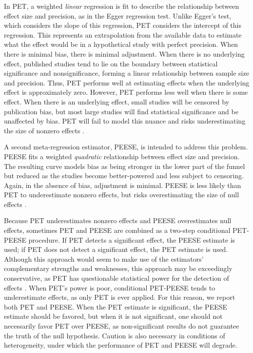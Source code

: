 \documentclass[jou]{apa6}
\begin{document}
In PET, a weighted {\em linear} regression is fit to describe the relationship between effect size and precision, as in the Egger regression test. Unlike Egger's test, which considers the slope of this regression, PET considers the intercept of this regression. This represents an extrapolation from the available data to estimate what the effect would be in a hypothetical study with perfect precision. When there is minimal bias, there is minimal adjustment. When there is no underlying effect, published studies tend to lie on the boundary between statistical significance and nonsignificance, forming a linear relationship between sample size and precision. Thus, PET performs well at estimating effects when the underlying effect is approximately zero. However, PET performs less well when there is some effect. When there is an underlying effect, small studies will be censored by publication bias, but most large studies will find statistical significance and be unaffected by bias. PET will fail to model this nuance and risks underestimating the size of nonzero effects \citep{Stanley:Doucouliagos:2014}.

A second meta-regression estimator, PEESE, is intended to address this problem. PEESE fits a weighted {\em quadratic} relationship between effect size and precision. The resulting curve models bias as being stronger in the lower part of the funnel but reduced as the studies become better-powered and less subject to censoring. Again, in the absence of bias, adjustment is minimal. PEESE is less likely than PET to underestimate nonzero effects, but risks overestimating the size of null effects \citep{Stanley:Doucouliagos:2014}.

Because PET underestimates nonzero effects and PEESE overestimates null effects, sometimes PET and PEESE are combined as a two-step conditional PET-PEESE procedure. If PET detects a significant effect, the PEESE estimate is used; if PET does not detect a significant effect, the PET estimate is used. Although this approach would seem to make use of the estimators' complementary strengths and weaknesses, this approach may be exceedingly conservative, as PET has questionable statistical power for the detection of effects \citep{Gervais:2015}. When PET's power is poor, conditional PET-PEESE tends to underestimate effects, as only PET is ever applied. For this reason, we report both PET and PEESE. When the PET estimate is significant, the PEESE estimate should be favored, but when it is not significant, one should not necessarily favor PET over PEESE, as non-significant results do not guarantee the truth of the null hypothesis. Caution is also necessary in conditions of heterogeneity, under which the performance of PET and PEESE will degrade.
\end{document}
